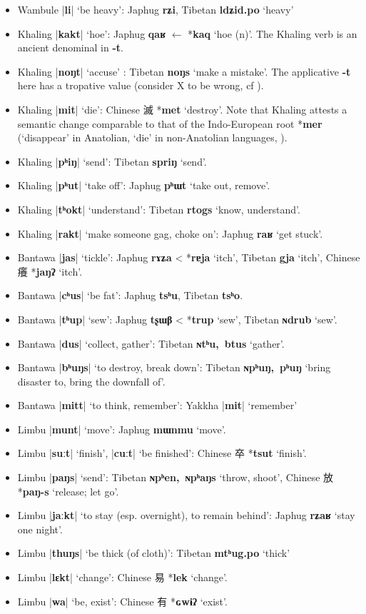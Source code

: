 \documentclass[oldfontcommands,oneside,a4paper,11pt]{article}
\newcommand{\ipa}[1]{\textbf{{\phon\mbox{#1}}}} %
\newcommand{\zh}[1]{{\cn #1}}
\newcommand{\dhatu}[2]{|\ipa{#1}| `#2'}
\begin{document}
\begin{itemize}
\item Wambule \dhatu{li}{be heavy}: Japhug \ipa{rʑi}, Tibetan \ipa{ldʑid.po} `heavy'
\item Khaling \dhatu{kakt}{hoe}: Japhug \ipa{qaʁ} $\leftarrow$ *\ipa{kaq} `hoe (n)'. The Khaling verb is an ancient denominal in \ipa{-t}.
\item Khaling \dhatu{noŋt}{accuse} : Tibetan \ipa{noŋs} `make a mistake'. The applicative \ipa{-t} here has a tropative value (consider X to be wrong, cf \citealt{jacques13tropative}).
\item Khaling \dhatu{mit}{die}: Chinese \zh{滅} *\ipa{met} `destroy'. Note that Khaling attests a semantic change comparable to that of the Indo-European root *\ipa{mer} (`disappear' in Anatolian, `die' in non-Anatolian languages, \citealt[439-440]{liv}).
\item Khaling \dhatu{pʰiŋ}{send}: Tibetan \ipa{spriŋ} `send'.
\item Khaling \dhatu{pʰut}{take off}: Japhug \ipa{pʰɯt} `take out, remove'.
\item Khaling \dhatu{tʰokt}{understand}: Tibetan \ipa{rtogs} `know, understand'.
\item Khaling \dhatu{rakt}{make someone gag, choke on}: Japhug \ipa{raʁ} `get stuck'.
\item Bantawa \dhatu{jas}{tickle}: Japhug \ipa{rɤʑa} < *\ipa{rɐja} `itch', Tibetan \ipa{gja} `itch', Chinese \zh{癢} *\ipa{jaŋʔ} `itch'.
\item Bantawa \dhatu{cʰus}{be fat}: Japhug \ipa{tsʰu}, Tibetan \ipa{tsʰo}.
\item Bantawa \dhatu{tʰup}{sew}: Japhug \ipa{tʂɯβ} < *\ipa{trup} `sew', Tibetan \ipa{ɴdrub} `sew'.
\item Bantawa \dhatu{dus}{collect, gather}: Tibetan \ipa{ɴtʰu, btus} `gather'.
\item Bantawa \dhatu{bʰuŋs}{to destroy, break down}: Tibetan \ipa{ɴpʰuŋ, pʰuŋ} `bring disaster to, bring the downfall of'.
\item Bantawa \dhatu{mitt}{to think, remember}: Yakkha \dhatu{mit}{remember}
\item Limbu \dhatu{munt}{move}: Japhug \ipa{mɯnmu} `move'.
\item Limbu \dhatu{suːt}{finish}, \dhatu{cuːt}{be finished}: Chinese \zh{卒} *\ipa{tsut} `finish'.
\item Limbu \dhatu{paŋs}{send}: Tibetan \ipa{ɴpʰen, ɴpʰaŋs} `throw, shoot', Chinese \zh{放} *\ipa{paŋ-s} `release; let go'.
\item Limbu \dhatu{jaːkt}{to stay (esp. overnight), to remain behind}: Japhug \ipa{rʑaʁ} `stay one night'.
\item Limbu \dhatu{thuŋs}{be thick (of cloth)}: Tibetan \ipa{mtʰug.po} `thick'
\item Limbu \dhatu{lɛkt}{change}: Chinese \zh{易} *\ipa{lek} `change'.
\item Limbu \dhatu{wa}{be, exist}: Chinese \zh{有} *\ipa{ɢwɨʔ} `exist'.
\end{itemize}
 


\end{document}
